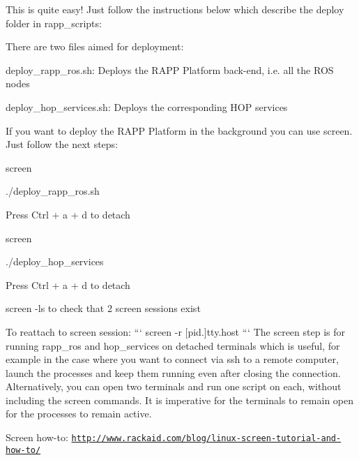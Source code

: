 This is quite easy! Just follow the instructions below which describe the {\ttfamily deploy} folder in {\ttfamily rapp\-\_\-scripts}\-:

There are two files aimed for deployment\-:


\begin{DoxyItemize}
\item {\ttfamily deploy\-\_\-rapp\-\_\-ros.\-sh}\-: Deploys the R\-A\-P\-P Platform back-\/end, i.\-e. all the R\-O\-S nodes
\item {\ttfamily deploy\-\_\-hop\-\_\-services.\-sh}\-: Deploys the corresponding H\-O\-P services
\end{DoxyItemize}

If you want to deploy the R\-A\-P\-P Platform in the background you can use {\ttfamily screen}. Just follow the next steps\-:


\begin{DoxyItemize}
\item {\ttfamily screen}
\item {\ttfamily ./deploy\-\_\-rapp\-\_\-ros.sh}
\item Press Ctrl + a + d to detach
\item {\ttfamily screen}
\item {\ttfamily ./deploy\-\_\-hop\-\_\-services}
\item Press Ctrl + a + d to detach
\item {\ttfamily screen -\/ls} to check that 2 screen sessions exist
\end{DoxyItemize}

To reattach to screen session\-: ``` screen -\/r \mbox{[}pid.\mbox{]}tty.\-host ``` The screen step is for running rapp\-\_\-ros and hop\-\_\-services on detached terminals which is useful, for example in the case where you want to connect via ssh to a remote computer, launch the processes and keep them running even after closing the connection. Alternatively, you can open two terminals and run one script on each, without including the screen commands. It is imperative for the terminals to remain open for the processes to remain active.

Screen how-\/to\-: \href{http://www.rackaid.com/blog/linux-screen-tutorial-and-how-to/}{\tt http\-://www.\-rackaid.\-com/blog/linux-\/screen-\/tutorial-\/and-\/how-\/to/} 